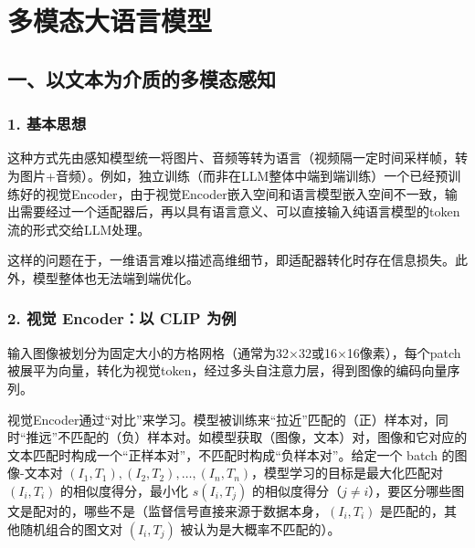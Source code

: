 \setcounter{section}{5}

\hypertarget{ux591aux6a21ux6001ux5927ux8bedux8a00ux6a21ux578b}{%
\section{多模态大语言模型}\label{ux591aux6a21ux6001ux5927ux8bedux8a00ux6a21ux578b}}

\hypertarget{ux4e00ux4ee5ux6587ux672cux4e3aux4ecbux8d28ux7684ux591aux6a21ux6001ux611fux77e5}{%
\subsection{一、以文本为介质的多模态感知}\label{ux4e00ux4ee5ux6587ux672cux4e3aux4ecbux8d28ux7684ux591aux6a21ux6001ux611fux77e5}}

\hypertarget{ux57faux672cux601dux60f3}{%
\subsubsection{1. 基本思想}\label{ux57faux672cux601dux60f3}}

这种方式先由感知模型统一将图片、音频等转为语言（视频隔一定时间采样帧，转为图片+音频）。例如，独立训练（而非在LLM整体中端到端训练）一个已经预训练好的视觉Encoder，由于视觉Encoder嵌入空间和语言模型嵌入空间不一致，输出需要经过一个适配器后，再以具有语言意义、可以直接输入纯语言模型的token流的形式交给LLM处理。

这样的问题在于，一维语言难以描述高维细节，即适配器转化时存在信息损失。此外，模型整体也无法端到端优化。

\hypertarget{ux89c6ux89c9-encoderux4ee5-clip-ux4e3aux4f8b}{%
\subsubsection{2. 视觉 Encoder：以 CLIP 为例}\label{ux89c6ux89c9-encoderux4ee5-clip-ux4e3aux4f8b}}

输入图像被划分为固定大小的方格网格（通常为32×32或16×16像素），每个patch被展平为向量，转化为视觉token，经过多头自注意力层，得到图像的编码向量序列。

视觉Encoder通过``对比''来学习。模型被训练来``拉近''匹配的（正）样本对，同时``推远''不匹配的（负）样本对。如模型获取（图像，文本）对，图像和它对应的文本匹配时构成一个``正样本对''，不匹配时构成``负样本对''。给定一个 batch 的图像-文本对 \((I_1,T_1),(I_2,T_2),\ldots,(I_n,T_n)\)，模型学习的目标是最大化匹配对 \((I_i,T_i)\) 的相似度得分，最小化 \(s(I_i,T_j)\) 的相似度得分（\(j\ne i\)），要区分哪些图文是配对的，哪些不是（监督信号直接来源于数据本身，\((I_i,T_i)\) 是匹配的，其他随机组合的图文对 \((I_i,T_j)\) 被认为是大概率不匹配的）。

